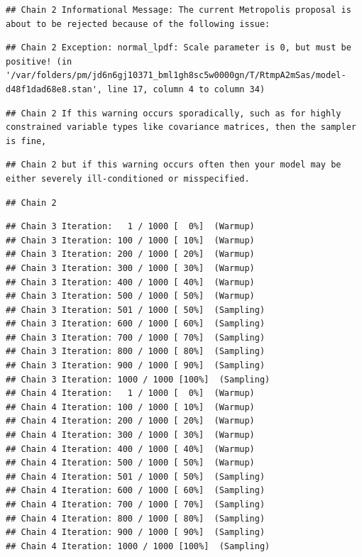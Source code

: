 \documentclass[
]{book}
\begin{document}
\begin{verbatim}
## Chain 2 Informational Message: The current Metropolis proposal is about to be rejected because of the following issue:
\end{verbatim}

\begin{verbatim}
## Chain 2 Exception: normal_lpdf: Scale parameter is 0, but must be positive! (in '/var/folders/pm/jd6n6gj10371_bml1gh8sc5w0000gn/T/RtmpA2mSas/model-d48f1dad68e8.stan', line 17, column 4 to column 34)
\end{verbatim}

\begin{verbatim}
## Chain 2 If this warning occurs sporadically, such as for highly constrained variable types like covariance matrices, then the sampler is fine,
\end{verbatim}

\begin{verbatim}
## Chain 2 but if this warning occurs often then your model may be either severely ill-conditioned or misspecified.
\end{verbatim}

\begin{verbatim}
## Chain 2
\end{verbatim}

\begin{verbatim}
## Chain 3 Iteration:   1 / 1000 [  0%]  (Warmup) 
## Chain 3 Iteration: 100 / 1000 [ 10%]  (Warmup) 
## Chain 3 Iteration: 200 / 1000 [ 20%]  (Warmup) 
## Chain 3 Iteration: 300 / 1000 [ 30%]  (Warmup) 
## Chain 3 Iteration: 400 / 1000 [ 40%]  (Warmup) 
## Chain 3 Iteration: 500 / 1000 [ 50%]  (Warmup) 
## Chain 3 Iteration: 501 / 1000 [ 50%]  (Sampling) 
## Chain 3 Iteration: 600 / 1000 [ 60%]  (Sampling) 
## Chain 3 Iteration: 700 / 1000 [ 70%]  (Sampling) 
## Chain 3 Iteration: 800 / 1000 [ 80%]  (Sampling) 
## Chain 3 Iteration: 900 / 1000 [ 90%]  (Sampling) 
## Chain 3 Iteration: 1000 / 1000 [100%]  (Sampling) 
## Chain 4 Iteration:   1 / 1000 [  0%]  (Warmup) 
## Chain 4 Iteration: 100 / 1000 [ 10%]  (Warmup) 
## Chain 4 Iteration: 200 / 1000 [ 20%]  (Warmup) 
## Chain 4 Iteration: 300 / 1000 [ 30%]  (Warmup) 
## Chain 4 Iteration: 400 / 1000 [ 40%]  (Warmup) 
## Chain 4 Iteration: 500 / 1000 [ 50%]  (Warmup) 
## Chain 4 Iteration: 501 / 1000 [ 50%]  (Sampling) 
## Chain 4 Iteration: 600 / 1000 [ 60%]  (Sampling) 
## Chain 4 Iteration: 700 / 1000 [ 70%]  (Sampling) 
## Chain 4 Iteration: 800 / 1000 [ 80%]  (Sampling) 
## Chain 4 Iteration: 900 / 1000 [ 90%]  (Sampling) 
## Chain 4 Iteration: 1000 / 1000 [100%]  (Sampling)
\end{verbatim}
\end{document}
